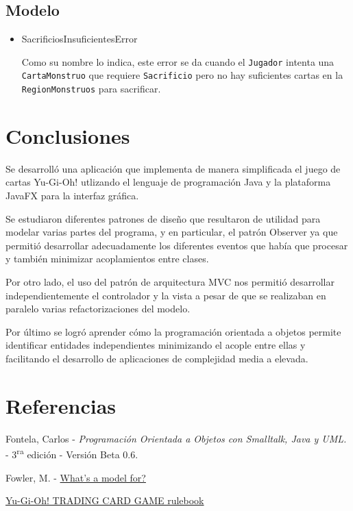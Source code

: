 	\subsection{Modelo}
	
	\begin{itemize}
		\item SacrificiosInsuficientesError
		
		Como su nombre lo indica, este error se da cuando el \texttt{Jugador} intenta  una \texttt{CartaMonstruo} que requiere \texttt{Sacrificio} pero no hay suficientes cartas en la \texttt{RegionMonstruos} para sacrificar.
		
	\end{itemize}
	
	\section{Conclusiones}
	
	Se desarrolló una aplicación que implementa de manera simplificada el juego de cartas Yu-Gi-Oh! utlizando el lenguaje de programación Java y la plataforma JavaFX para la interfaz gráfica.
	
	Se estudiaron diferentes patrones de diseño que resultaron de utilidad para modelar varias partes del programa, y en particular, el patrón Observer ya que permitió desarrollar adecuadamente los diferentes eventos que había que procesar y también minimizar acoplamientos entre clases.
	
	Por otro lado, el uso del patrón de arquitectura MVC nos permitió desarrollar independientemente el controlador y la vista a pesar de que se realizaban en paralelo varias refactorizaciones del modelo.
	
	Por último se logró aprender cómo la programación orientada a objetos permite identificar entidades independientes minimizando el acople entre ellas y facilitando el desarrollo de aplicaciones de complejidad media a elevada.
	
	\appendix
	\section{Referencias}
	\begingroup
	\renewcommand{\section}[2]{}
	\begin{thebibliography}{10}
		 Fontela, Carlos - \emph{Programación Orientada a Objetos con Smalltalk, Java y UML.} - 3\textsuperscript{ra} edición - Versión Beta 0.6.
		
		 Fowler, M. - \hyperref{https://martinfowler.com/distributedComputing/purpose.pdf}{}{}{What's a model for?}
		
		 \hyperref{https://www.yugioh-card.com/en/rulebook/SD_RuleBook_EN_10.pdf}{}{}{Yu-Gi-Oh! TRADING CARD GAME rulebook}
	\end{thebibliography}
	\endgroup
	

